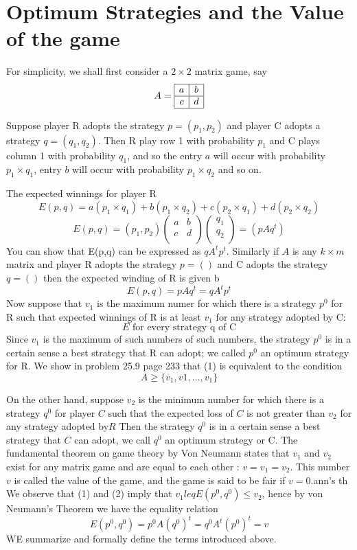 \documentclass[]{report}
\begin{document}
\section{Optimum Strategies and the Value of the game}
For simplicity, we shall first consider a $2 \times 2$ matrix game, say 
\[ A = \begin{array}{|c|c|} \hline
a & b \\ \hline
c & d \\ \hline
\end{array} \]

Suppose player R adopts the strategy $p=(p_1,p_2)$ and player C adopts a strategy $q=(q_1,q_2)$. Then R play row 1 with 
probability $p_1$ and C plays column 1 with probability $q_1$, and so the entry $a$ will occur with probability $p_1 \times q_1$, entry $b$ will occur with probability $p_1 \times q_2$ and so on.

The expected winnings for player R
\[ E(p,q) = a(p_1 \times q_1) + b(p_1 \times q_2) + c(p_2 \times q_1) + d(p_2 \times q_2) \]
\[ E(p,q) = (p_1,p_2) \left(\begin{array}{cc} 
a & b \\
c & d \\ \end{array} \right)\left(\begin{array}{c} 
q_1\\
q_2\\ \end{array} \right) = (p A q^t) \]
You can show that E(p,q) can be expressed as $q A^t p^t$.
\smallskip
Similarly if $A$ is any $k \times m$ matrix and player R adopts the strategy $p=()$ and C adopts the strategy $q=()$ then the expected winding of R is given b
\[ E(p,q) =  pAq^t = q A^t p^t \]
Now suppose that $v_1$ is the maximum numer for which there is a strategy $p^0$ for R such that expected winnings of R is at least $v_1$ for any strategy adopted by C:
\[E  \mbox{ for every strategy q of C}\]
Since $v_1$ is the maximum of such numbers of such numbers, the strategy $p^0$ is in a certain sense a best strategy that R can adopt; we called $p^0$ an optimum strategy for R.
We show in problem 25.9 page 233 that (1) is equivalent to the condition
\[ A \geq \{ v_1,v1,\ldots,v_1 \}\]

On the other hand, suppose $v_2$ is the minimum number for which there is a strategy $q^0$ for player $C$ such that 
the expected loss of $C$ is not greater than $v_2$ for any strategy adopted by$R$
Then the strategy $q^0$ is in a certain sense a best strategy that $C$ can adopt, we call $q^0$ an optimum strategy
or C.
The fundamental theorem on game theory by Von Neumann states that $v_1$ and $v_2$ exist for any matrix game
and are equal to each other : $v = v_1 = v_2$. This number $v$ is called the value of the game, and the game is said to be fair if $v=0$.ann's th
We observe that (1) and (2) imply that $v_1 leq E(p^0,q^0) \leq v_2$, hence by von Neumann's Theorem we have the 
equality relation
\[ E(p^0,q^0) = p^0 A (q^0)^{t} = q^0 A^t (p^0)^{t} = v\]
WE summarize and formally define the terms introduced above.
\end{document}
